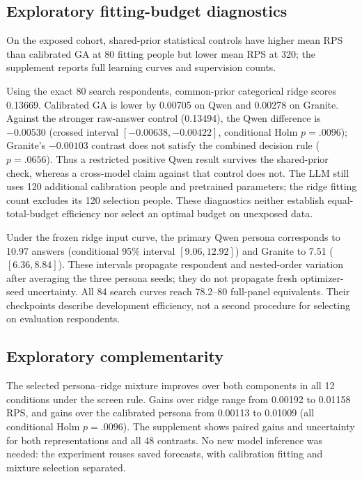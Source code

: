 \documentclass[sigconf,anonymous]{aamas}
\begin{document}
\subsection{Exploratory fitting-budget diagnostics}
On the exposed cohort, shared-prior statistical controls have higher mean RPS
than calibrated GA at 80 fitting people but lower mean RPS at 320; the
supplement reports full learning curves and supervision counts.

Using the exact 80 search respondents, common-prior categorical ridge scores
0.13669. Calibrated GA is lower by 0.00705 on Qwen and 0.00278 on Granite.
Against the stronger raw-answer control (0.13494), the Qwen difference is
$-0.00530$ (crossed interval $[-0.00638,-0.00422]$, conditional Holm
$p=.0096$); Granite's $-0.00103$ contrast does not satisfy the combined
decision rule ($p=.0656$). Thus a restricted positive Qwen result survives
the shared-prior check, whereas a cross-model claim against that control
does not. The LLM still uses 120 additional calibration people and pretrained
parameters; the ridge fitting count excludes its 120 selection people.
These diagnostics neither establish equal-total-budget efficiency nor select
an optimal budget on unexposed data.



Under the frozen ridge input curve, the primary Qwen persona corresponds
to 10.97 answers (conditional 95\% interval $[9.06,12.92]$) and Granite to
7.51 ($[6.36,8.84]$). These intervals propagate respondent and nested-order
variation after averaging the three persona seeds; they do not propagate
fresh optimizer-seed uncertainty. All 84 search curves reach 78.2--80
full-panel equivalents. Their checkpoints describe development efficiency,
not a second procedure for selecting on evaluation respondents.

\subsection{Exploratory complementarity}
The selected persona--ridge mixture improves over both components in all
12 conditions under the screen rule. Gains over ridge range from 0.00192 to
0.01158 RPS, and gains over the calibrated persona from 0.00113 to 0.01009
(all conditional Holm $p=.0096$). The supplement shows paired gains and uncertainty for both representations
and all 48 contrasts.
No new model inference was needed: the experiment reuses saved forecasts,
with calibration fitting and mixture selection separated.
\end{document}
